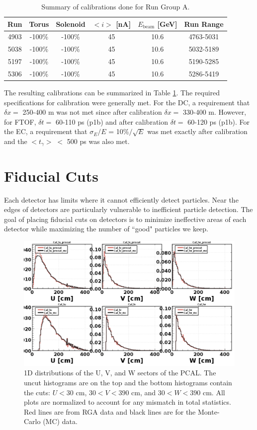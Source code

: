 \begin{table}[h!]
	\centering
	\begin{tabular}{ |c|c|c|c|c|c| } 
		\hline
		Run & Torus & Solenoid & $<i>$ [nA] & $E_{\mathrm{beam}}$ [GeV] & Run Range \\ 
		\hline
		4903 & -100\% & -100\% & 45 & 10.6 & 4763-5031 \\ 
		5038 & -100\% & -100\% & 45 & 10.6 & 5032-5189 \\ 
		5197 & -100\% & -100\% & 45 & 10.6 & 5190-5285 \\ 
		5306 & -100\% & -100\% & 45 & 10.6 & 5286-5419 \\ 
		\hline
	\end{tabular}
	\caption{Summary of calibrations done for Run Group A.}
	\label{tab:cal}
\end{table}

The resulting calibrations can be summarized in Table \ref{tab:cal}. The required specifications for calibration were generally met. For the DC, a requirement that $\delta x =$ 250-400 \textmu m was not met since after calibration $\delta x =$ 330-400 \textmu m. However, for FTOF, $\delta t =$ 60-110 ps (p1b) and after calibration $\delta t =$ 60-120 ps (p1b). For the EC, a requirement that $\sigma_E/E$ = 10\%$/\sqrt{E}$ was met exactly after calibration and the $<t_{\gamma}> \; <$ 500 ps was also met.

\section{Fiducial Cuts}
Each detector has limits where it cannot efficiently detect particles. Near the edges of detectors are particularly vulnerable to inefficient particle detection. The goal of placing fiducial cuts on detectors is to minimize ineffective areas of each detector while maximizing the number of ``good" particles we keep.

\begin{figure}[h!]
	\centering
	\includegraphics[width=0.9\linewidth]{figures/rga/1d_ecal.png}
	\caption{1D distributions of the U, V, and W sectors of the PCAL. The uncut histograms are on the top and the bottom histograms contain the cuts: $U<30$ cm, $30<V<390$ cm, and $30<W<390$ cm. All plots are normalized to account for any mismatch in total statistics. Red lines are from RGA data and black lines are for the Monte-Carlo (MC) data.}
	\label{fig:rga_1decal}
\end{figure}

